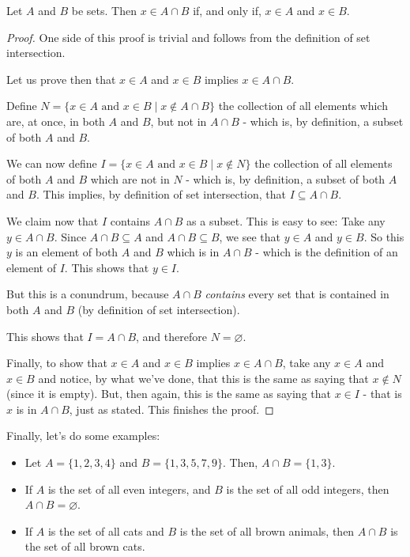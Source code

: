 \begin{lemma}
	Let $A$ and $B$ be sets. Then $x\in A\cap B$ if, and only if, $x\in A$ and $x\in B$.
\end{lemma}
\begin{proof}
	One side of this proof is trivial and follows from the definition of set intersection.
	
	Let us prove then that $x\in A$ and $x\in B$ implies $x\in A\cap B$.
	
	Define $N=\{x\in A\mbox{ and } x\in B\mid x\notin A\cap B\}$ the collection of all elements which are, at once, in both $A$ and $B$, but not in $A\cap B$ - which is, by definition, a subset of both $A$ and $B$.
	
	We can now define $I=\{x\in A\mbox{ and } x\in B\mid x\notin N\}$ the collection of all elements of both $A$ and $B$ which are not in $N$ - which is, by definition, a subset of both $A$ and $B$. This implies, by definition of set intersection, that $I\subseteq A\cap B$.
	
	We claim now that $I$ contains $A\cap B$ as a subset. This is easy to see: Take any $y\in A\cap B$. Since $A\cap B\subseteq A$ and $A\cap B\subseteq B$, we see that $y\in A$ and $y\in B$. So this $y$ is an element of both $A$ and $B$ which is in $A\cap B$ - which is the definition of an element of $I$. This shows that $y\in I$.
	
	But this is a conundrum, because $A\cap B$ \textit{contains} every set that is contained in both $A$ and $B$ (by definition of set intersection).
	
	This shows that $I=A\cap B$, and therefore $N=\varnothing$.
	
	Finally, to show that $x\in A$ and $x\in B$ implies $x\in A\cap B$, take any $x\in A$ and $x\in B$ and notice, by what we've done, that this is the same as saying that $x\notin N$ (since it is empty). But, then again, this is the same as saying that $x\in I$ - that is $x$ is in $A\cap B$, just as stated. This finishes the proof.
\end{proof}

Finally, let's do some examples:

\begin{ex}
	\begin{itemize}
		\item Let $A=\{1,2,3,4\}$ and $B=\{1,3,5,7,9\}$. Then, $A\cap B=\{1,3\}$.
		\item If $A$ is the set of all even integers, and $B$ is the set of all odd integers, then $A\cap B=\varnothing$.
		\item If $A$ is the set of all cats and $B$ is the set of all brown animals, then $A\cap B$ is the set of all brown cats.
	\end{itemize}
\end{ex}


